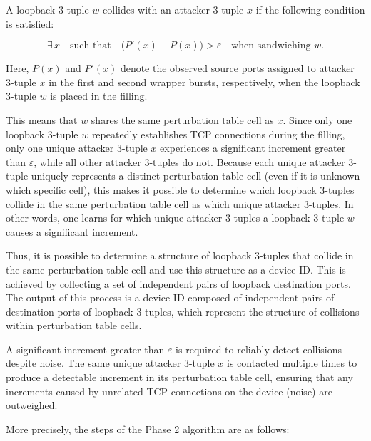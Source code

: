 \documentclass{report}
\begin{document}
A loopback 3-tuple \(w\) collides with an attacker 3-tuple \(x\) if the following condition is satisfied:

\begin{equation*}
    \exists\, x \quad \text{such that} \quad \bigl(P'(x) - P(x)\bigr) > \varepsilon
    \quad \text{when sandwiching } w.
\end{equation*}

Here, \(P(x)\) and \(P'(x)\) denote the observed source ports assigned to attacker 3-tuple \(x\) in the first and second wrapper bursts, respectively, when the loopback 3-tuple \(w\) is placed in the filling.

This means that \(w\) shares the same perturbation table cell as \(x\). Since only one loopback 3-tuple \(w\) repeatedly establishes TCP connections during the filling, only one unique attacker 3-tuple \(x\) experiences a significant increment greater than \(\varepsilon\), while all other attacker 3-tuples do not. Because each unique attacker 3-tuple uniquely represents a distinct perturbation table cell (even if it is unknown which specific cell), this makes it possible to determine which loopback 3-tuples collide in the same perturbation table cell as which unique attacker 3-tuples. In other words, one learns for which unique attacker 3-tuples a loopback 3-tuple \(w\) causes a significant increment.

Thus, it is possible to determine a structure of loopback 3-tuples that collide in the same perturbation table cell and use this structure as a device ID. This is achieved by collecting a set of independent pairs of loopback destination ports. The output of this process is a device ID composed of independent pairs of destination ports of loopback 3-tuples, which represent the structure of collisions within perturbation table cells.

A significant increment greater than \(\varepsilon\) is required to reliably detect collisions despite noise. The same unique attacker 3-tuple \(x\) is contacted multiple times to produce a detectable increment in its perturbation table cell, ensuring that any increments caused by unrelated TCP connections on the device (noise) are outweighed.

More precisely, the steps of the Phase 2 algorithm are as follows:
\end{document}
